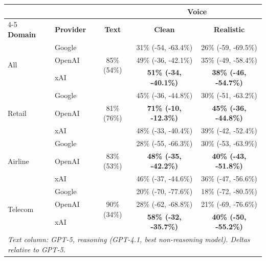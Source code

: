 \begin{tabular}{@{}llccc@{}}
\toprule
 &  &  & \multicolumn{2}{c}{\textbf{Voice}} \\
\cmidrule(l){4-5}
\textbf{Domain} & \textbf{Provider} & \textbf{Text} & \textbf{Clean} & \textbf{Realistic} \\
\midrule
\multirow{3}{*}{All} & Google & \multirow{3}{*}{85\% (54\%)} & 31\% (-54, -63.4\%) & 26\% (-59, -69.5\%) \\
 & OpenAI &  & 49\% (-36, -42.1\%) & 35\% (-49, -58.4\%) \\
 & xAI &  & \textbf{51\% (-34, -40.1\%)} & \textbf{38\% (-46, -54.7\%)} \\
\midrule
\multirow{3}{*}{Retail} & Google & \multirow{3}{*}{81\% (76\%)} & 45\% (-36, -44.8\%) & 30\% (-51, -63.2\%) \\
 & OpenAI &  & \textbf{71\% (-10, -12.3\%)} & \textbf{45\% (-36, -44.8\%)} \\
 & xAI &  & 48\% (-33, -40.4\%) & 39\% (-42, -52.4\%) \\
\midrule
\multirow{3}{*}{Airline} & Google & \multirow{3}{*}{83\% (53\%)} & 28\% (-55, -66.3\%) & 30\% (-53, -63.9\%) \\
 & OpenAI &  & \textbf{48\% (-35, -42.2\%)} & \textbf{40\% (-43, -51.8\%)} \\
 & xAI &  & 46\% (-37, -44.6\%) & 36\% (-47, -56.6\%) \\
\midrule
\multirow{3}{*}{Telecom} & Google & \multirow{3}{*}{90\% (34\%)} & 20\% (-70, -77.6\%) & 18\% (-72, -80.5\%) \\
 & OpenAI &  & 28\% (-62, -68.8\%) & 21\% (-69, -76.6\%) \\
 & xAI &  & \textbf{58\% (-32, -35.7\%)} & \textbf{40\% (-50, -55.2\%)} \\
\bottomrule
\multicolumn{5}{l}{\footnotesize \textit{Text column: GPT-5, reasoning (GPT-4.1, best non-reasoning model). Deltas relative to GPT-5.}} \\
\end{tabular}
